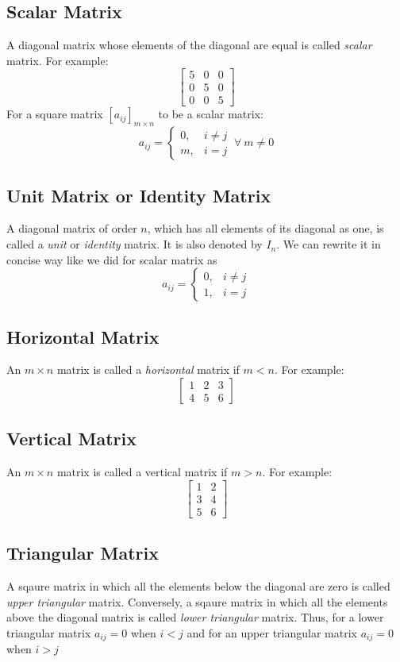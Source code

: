 \subsection{Scalar Matrix}
A diagonal matrix whose elements of the diagonal are equal is called \textit{scalar} matrix. For example:
\[\begin{bmatrix}5 & 0 & 0 \\ 0 & 5 & 0 \\ 0 & 0 & 5\end{bmatrix}\]
For a square matrix $[a_{ij}]_{m\times n}$ to be a scalar matrix:
\[a_{ij} = \begin{cases}0, & i\neq j \\ m,& i = j\end{cases}~\forall~m\neq 0\]

\subsection{Unit Matrix or Identity Matrix}
A diagonal matrix of order $n$, which has all elements of its diagonal as one, is called a \textit{unit} or \textit{identity}
matrix. It is also denoted by $I_n$. We can rewrite it in concise way like we did for scalar matrix as
\[a_{ij} = \begin{cases}0, & i\neq j \\ 1,& i = j\end{cases}\]

\subsection{Horizontal Matrix}
An $m\times n$ matrix is called a \textit{horizontal} matrix if $m < n$. For example:
\[\begin{bmatrix}1 & 2 & 3\\4 & 5 & 6\end{bmatrix}\]

\subsection{Vertical Matrix}
An $m\times n$ matrix is called a vertical matrix if $m > n$. For example:
\[\begin{bmatrix}1 & 2 \\ 3 & 4 \\ 5 & 6\end{bmatrix}\]

\subsection{Triangular Matrix}
A sqaure matrix in which all the elements below the diagonal are zero is called \textit{upper triangular} matrix. Conversely, a
sqaure matrix in which all the elements above the diagonal matrix is called \textit{lower triangular} matrix. Thus, for a lower
triangular matrix $a_{ij} = 0$ when $i < j$ and for an upper triangular matrix $a_{ij} = 0$ when $i > j$

